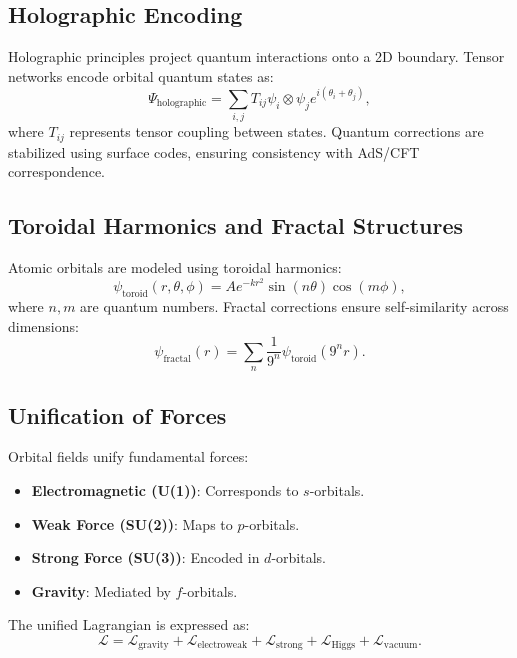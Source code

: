 \documentclass[12]{amsart}
\theoremstyle{plain}
\begin{document}
\subsection{Holographic Encoding}
Holographic principles project quantum interactions onto a 2D boundary. Tensor networks encode orbital quantum states as:
\begin{equation}
    \Psi_{\text{holographic}} = \sum_{i,j} T_{ij} \psi_i \otimes \psi_j e^{i(\theta_i + \theta_j)},
\end{equation}
where \( T_{ij} \) represents tensor coupling between states. Quantum corrections are stabilized using surface codes, ensuring consistency with AdS/CFT correspondence.

\subsection{Toroidal Harmonics and Fractal Structures}
Atomic orbitals are modeled using toroidal harmonics:
\begin{equation}
    \psi_{\text{toroid}}(r, \theta, \phi) = A e^{-k r^2} \sin(n \theta) \cos(m \phi),
\end{equation}
where \( n, m \) are quantum numbers. Fractal corrections ensure self-similarity across dimensions:
\begin{equation}
    \psi_{\text{fractal}}(r) = \sum_{n} \frac{1}{9^n} \psi_{\text{toroid}}(9^n r).
\end{equation}

\subsection{Unification of Forces}
Orbital fields unify fundamental forces:
\begin{itemize}
    \item \textbf{Electromagnetic (U(1))}: Corresponds to \( s \)-orbitals.
    \item \textbf{Weak Force (SU(2))}: Maps to \( p \)-orbitals.
    \item \textbf{Strong Force (SU(3))}: Encoded in \( d \)-orbitals.
    \item \textbf{Gravity}: Mediated by \( f \)-orbitals.
\end{itemize}
The unified Lagrangian is expressed as:
\begin{equation}
    \mathcal{L} = \mathcal{L}_{\text{gravity}} + \mathcal{L}_{\text{electroweak}} + \mathcal{L}_{\text{strong}} + \mathcal{L}_{\text{Higgs}} + \mathcal{L}_{\text{vacuum}}.
\end{equation}
\end{document}
